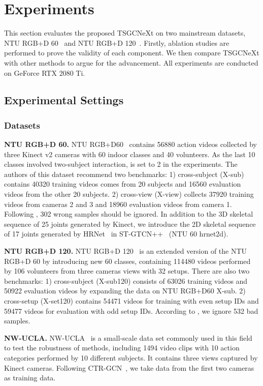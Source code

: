 \documentclass[10pt,twocolumn,letterpaper]{article}
\begin{document}
\section{Experiments}
This section evaluates the proposed TSGCNeXt on two mainstream datasets, NTU RGB+D 60~\cite{shahroudy2016ntu} and NTU RGB+D 120~\cite{liu2019ntu}. Firstly, ablation studies are performed to prove the validity of each component. We then compare TSGCNeXt with other methods to argue for the advancement. All experiments are conducted on GeForce RTX 2080 Ti.

\subsection{Experimental Settings}
\label{sec:exp-setting}
\subsubsection{Datasets}
\noindent\textbf{NTU RGB+D 60.} NTU RGB+D60~\cite{shahroudy2016ntu} contains 56880 action videos collected by three Kinect v2 cameras with 60 indoor classes and 40 volunteers. As the last 10 classes involved two-subject interaction,  is set to 2 in the experiments. The authors of this dataset recommend two benchmarks: 1) cross-subject (X-sub) contains 40320 training videos comes from 20 subjects and 16560 evaluation videos from the other 20 subjects. 2) cross-view (X-view) collects 37920 training videos from cameras 2 and 3 and 18960 evaluation videos from camera 1. Following \cite{liu2019ntu}, 302 wrong samples should be ignored. In addition to the 3D skeletal sequence of 25 joints generated by Kinect, we introduce the 2D skeletal sequence of 17 joints generated by HRNet~\cite{wang2020deep} in ST-GTCN++~\cite{duan2021revisiting} (NTU 60 hrnet2d).

\noindent\textbf{NTU RGB+D 120.} NTU RGB+D 120~\cite{liu2019ntu} is an extended version of the NTU RGB+D 60 by introducing new 60 classes, containing 114480 videos performed by 106 volunteers from three cameras views with 32 setups. There are also two benchmarks: 1) cross-subject (X-sub120) consists of 63026 training videos and 50922 evaluation videos by expanding the data on NTU RGB+D60 X-sub. 2) cross-setup (X-set120) contains 54471 videos for training with even setup IDs and 59477 videos for evaluation with odd setup IDs. According to \cite{liu2019ntu}, we ignore 532 bad samples.

\noindent\textbf{NW-UCLA.} NW-UCLA~\cite{wang2014cross} is a small-scale data set commonly used in this field to test the robustness of methods, including 1494 video clips with 10 action categories performed by 10 different subjects. It contains three views captured by Kinect cameras. Following CTR-GCN~\cite{chen2021channel}, we take data from the first two cameras as training data.
\end{document}
